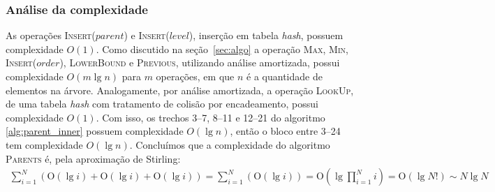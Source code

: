 \subsubsection{Análise da complexidade}
As operações \textsc{Insert}($parent$) e \textsc{Insert}($level$), inserção em tabela
\textit{hash}, possuem complexidade $O(1)$.
Como discutido na seção~\ref{sec:algo}
a operação \textsc{Max}, \textsc{Min}, \textsc{Insert}($order$), \textsc{LowerBound} e \textsc{Previous}, utilizando análise amortizada, possui
complexidade $O(m \lg n)$ para $m$ operações, em que $n$ é a quantidade de elementos na árvore.  Analogamente, por análise amortizada, a operação
\textsc{LookUp}, de uma tabela \textit{hash} com tratamento de colisão por
encadeamento, possui complexidade $O(1)$. Com isso, os trechos 3--7, 8--11 e
12--21 do algoritmo \ref{alg:parent_inner} possuem complexidade $O(\lg n)$, então o bloco entre 3--24 tem complexidade $O(\lg n)$. Concluímos que a complexidade do algoritmo \textsc{Parents} é, pela aproximação de
Stirling:
\begin{align*}
  \sum_{i = 1}^{N}(\text{O}(\lg i) + \text{O}(\lg i) + \text{O}(\lg i)) = \sum_{i = 1}^{N}(\text{O}(\lg i)) = \text{O}(\lg \prod_{i = 1}^{N} i) = \text{O}(\lg N!) \sim N \lg N
\end{align*}